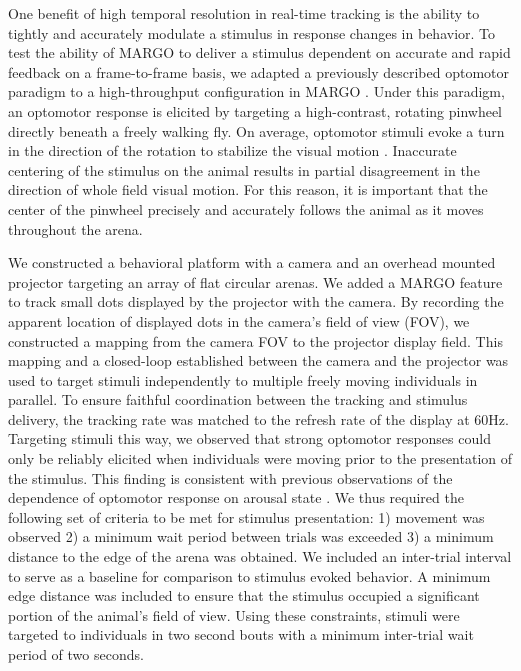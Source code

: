 \documentclass[10pt]{article}
\begin{document}
\begin{multicols}{2}
One benefit of high temporal resolution in real-time tracking is the ability to tightly and accurately modulate a stimulus in response changes in behavior. To test the ability of MARGO to deliver a stimulus dependent on accurate and rapid feedback on a frame-to-frame basis, we adapted a previously described optomotor paradigm to a high-throughput configuration in MARGO \cite{Fujiwara_A_2017}. Under this paradigm, an optomotor response is elicited by targeting a high-contrast, rotating pinwheel directly beneath a freely walking fly. On average, optomotor stimuli evoke a turn in the direction of the rotation to stabilize the visual motion \cite{Gtz_Visual_1973}. Inaccurate centering of the stimulus on the animal results in partial disagreement in the direction of whole field visual motion. For this reason, it is important that the center of the pinwheel precisely and accurately follows the animal as it moves throughout the arena.

We constructed a behavioral platform with a camera and an overhead mounted projector targeting an array of flat circular arenas. We added a MARGO feature to track small dots displayed by the projector with the camera. By recording the apparent location of displayed dots in the camera's field of view (FOV), we constructed a mapping from the camera FOV to the projector display field. This mapping and a closed-loop established between the camera and the projector was used to target stimuli independently to multiple freely moving individuals in parallel. To ensure faithful coordination between the tracking and stimulus delivery, the tracking rate was matched to the refresh rate of the display at 60Hz. Targeting stimuli this way, we observed that strong optomotor responses could only be reliably elicited when individuals were moving prior to the presentation of the stimulus. This finding is consistent with previous observations of the dependence of optomotor response on arousal state \cite{Zhu_Peripheral_2009,Kim_Fly_2016}. We thus required the following set of criteria to be met for stimulus presentation: 1) movement was observed 2) a minimum wait period between trials was exceeded 3) a minimum distance to the edge of the arena was obtained. We included an inter-trial interval to serve as a baseline for comparison to stimulus evoked behavior. A minimum edge distance was included to ensure that the stimulus occupied a significant portion of the animal's field of view. Using these constraints, stimuli were targeted to individuals in two second bouts with a minimum inter-trial wait period of two seconds. 


\end{multicols}
\end{document}
